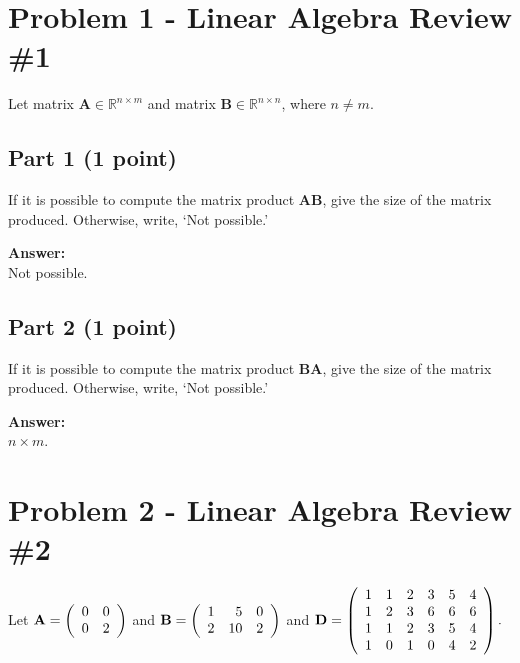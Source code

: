 \documentclass[11pt, oneside]{article}   	%
\begin{document}



\clearpage

\section*{Problem 1 - Linear Algebra Review \#1}

Let matrix $\mathbf{A} \in \mathbb{R}^{n\times m}$ and matrix  $\mathbf{B} \in \mathbb{R}^{n \times n}$, where $n \neq m$.

\subsection*{Part 1 (1 point)}
 If it is possible to compute the matrix product $\mathbf{AB}$, give the size of the matrix produced. Otherwise, write, `Not possible.' 

\textbf{Answer:} \\Not possible.

\subsection*{Part 2 (1 point)}
If it is possible to compute the matrix product $\mathbf{BA}$, give the size of the matrix produced. Otherwise, write, `Not possible.' 

\textbf{Answer:} \\$n\times m$.

\clearpage

\section*{Problem 2 - Linear Algebra Review \#2}
Let  $
 {\bf{A}} = \left( {\begin{array}{*{20}r}
   0 & 0   \\
   0 & 2   \\
\end{array}} \right)
 $
and
$
 {\bf{B}} = \left( {\begin{array}{*{20}r}
   1 & 5 & 0  \\
   2 & 10 & 2  \\
\end{array}} \right)  
$
and
${\bf{D}} = \left( {\begin{array}{*{20}r}
   1 & 1 & 2 & 3 & 5 & 4 \\
   1 & 2 & 3 & 6 & 6 & 6 \\
   1 & 1 & 2 & 3 & 5 & 4 \\
   1 & 0 & 1 & 0 & 4 & 2 \\
\end{array}} \right). \\ 
$ 
\end{document}
